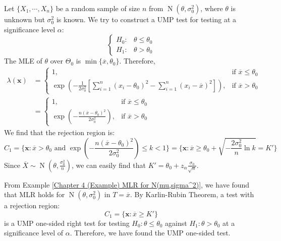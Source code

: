 \documentclass{huhtakm-template-book-v2}
\DeclareMathOperator{\N}{N}
\begin{document}
\begin{eg}
	Let $\{X_{1},\cdots,X_{n}\}$ be a random sample of size $n$ from $\N(\theta,\sigma_{0}^{2})$, where $\theta$ is unknown but $\sigma_{0}^{2}$ is known. We try to construct a UMP test for testing at a significance level $\alpha$:
	\begin{equation*}
		\begin{cases}
			H_{0}: &\theta\leq\theta_{0}\\
			H_{1}: &\theta>\theta_{0}
		\end{cases}
	\end{equation*}
	The MLE of $\theta$ over $\Theta_{0}$ is $\min\{\overline{x},\theta_{0}\}$. Therefore,
	\begin{align*}
		\lambda(\mathbf{x})&=\begin{cases}
			1, &\text{if }\overline{x}\leq\theta_{0}\\
			\exp\left(-\frac{1}{2\sigma_{0}^{2}}\left[\sum_{i=1}^{n}(x_{i}-\theta_{0})^{2}-\sum_{i=1}^{n}(x_{i}-\overline{x})^{2}\right]\right), &\text{if }\overline{x}>\theta_{0}
		\end{cases}\\
		&=\begin{cases}
			1, &\text{if }\overline{x}\leq\theta_{0}\\
			\exp\left(-\frac{n(\overline{x}-\theta_{0})^{2}}{2\sigma_{0}^{2}}\right), &\text{if }\overline{x}>\theta_{0}
		\end{cases}
	\end{align*}
	We find that the rejection region is:
	\begin{equation*}
		C_{1}=\biggl\{\mathbf{x}:\overline{x}>\theta_{0}\text{ and }\exp\left(-\frac{n(\overline{x}-\theta_{0})^{2}}{2\sigma_{0}^{2}}\right)\leq k<1\biggr\}=\biggl\{\mathbf{x}:\overline{x}\geq\theta_{0}+\sqrt{-\frac{2\sigma_{0}^{2}}{n}\ln{k}}=K'\biggr\}
	\end{equation*}
	Since $\overline{X}\sim\N(\theta,\frac{\sigma_{0}^{2}}{n})$, we can easily find that $K'=\theta_{0}+z_{\alpha}\frac{\sigma_{0}}{\sqrt{n}}$.
	
	From Example \ref{Chapter 4 (Example) MLR for N(mu,sigma^2)}, we have found that MLR holds for $\N(\theta,\sigma_{0}^{2})$ in $T=\overline{x}$. By Karlin-Rubin Theorem, a test with a rejection region:
	\begin{equation*}
		C_{1}=\{\mathbf{x}:\overline{x}\geq K'\}
	\end{equation*}
	is a UMP one-sided right test for testing $H_{0}:\theta\leq\theta_{0}$ against $H_{1}:\theta>\theta_{0}$ at a significance level of $\alpha$. Therefore, we have found the UMP one-sided test.
\end{eg}
\end{document}
